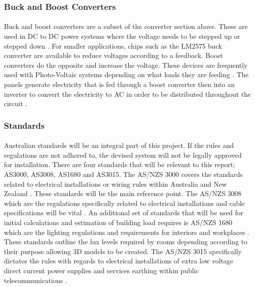 \subsubsection{Buck and Boost Converters}

\paragraph{}
Buck and boost converters are a subset of the converter section above. These are used in DC to DC power systems where the voltage needs to be stepped up or stepped down \cite{textbook:Abu-Rub2014}. For smaller applications, chips such as the LM2575 buck converter are available to reduce voltages according to a feedback. Boost converters do the opposite and increase the voltage. These devices are frequently used with Photo-Voltaic systems depending on what loads they are feeding \cite{textbook:Abu-Rub2014}. The panels generate electricity that is fed through a boost converter then into an inverter to convert the electricity to AC in order to be distributed throughout the circuit \cite{textbook:Abu-Rub2014}.     

\subsubsection{Standards}

\paragraph{}
Australian standards will be an integral part of this project. If the rules and regulations are not adhered to, the devised system will not be legally approved for installation. There are four standards that will be relevant to this report; AS3000, AS3008, AS1680 and AS3015. The AS/NZS 3000 covers the standards related to electrical installations or wiring rules within Australia and New Zealand \cite{StandardsAustralia2007}. These standards will be the main reference point. The AS/NZS 3008 which are the regulations specifically related to electrical installations and cable specifications will be vital \cite{StandardsAustralia2010}. An additional set of standards that will be used for initial calculations and estimation of building load requires is AS/NZS 1680 which are the lighting regulations and requirements for interiors and workplaces \cite{StandardsAustralia2006_2}. These standards outline the lux levels required by rooms depending according to their purpose allowing 3D models to be created. The AS/NZS 3015 specifically dictates the rules with regards to electrical installations of extra low voltage direct current power supplies and services earthing within public telecommunications \cite{StandardsAustralia2004}.     

